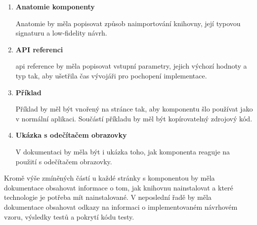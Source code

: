\begin{enumerate}
    \item \textbf{Anatomie komponenty}

          Anatomie by měla popisovat způsob naimportování knihovny, její typovou signaturu a low-fidelity návrh.

    \item \textbf{API referenci}

          \gls{api} reference by měla popisovat vstupní parametry, jejich výchozí hodnoty a typ tak, aby ušetřila čas vývojáři pro pochopení implementace.

    \item \textbf{Příklad}

          Příklad by měl být vnořený na stránce tak, aby komponentu šlo používat jako v normální aplikaci. Součástí příkladu by měl být kopírovatelný zdrojový kód.

    \item \textbf{Ukázka s odečítačem obrazovky}

          V dokumentaci by měla být i ukázka toho, jak komponenta reaguje na použití s odečítačem obrazovky.

\end{enumerate}

Kromě výše zmíněných částí u každé stránky s komponentou by měla dokumentace obsahovat informace o tom, jak knihovnu nainstalovat a které technologie je potřeba mít nainstalované.
V neposlední řadě by měla dokumentace obsahovat odkazy na informaci o implementovaném návrhovém vzoru, výsledky testů a pokrytí kódu testy.
